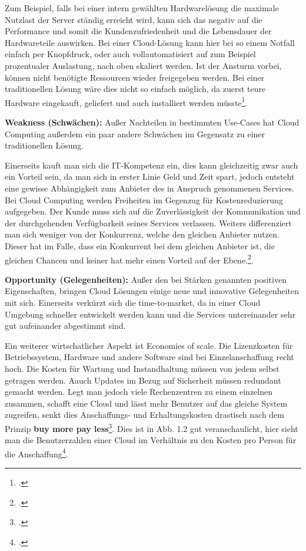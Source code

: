Zum Beispiel, falls bei einer intern gewählten Hardwarelösung die maximale Nutzlast der Server ständig erreicht wird, kann sich das negativ auf die Performance und somit die Kundenzufriedenheit und die Lebensdauer der 
Hardwareteile auswirken. Bei einer Cloud-Lösung kann hier bei so einem Notfall einfach per Knopfdruck, oder auch vollautomatisiert auf zum Beispiel prozentualer Auslastung, nach oben skaliert werden. Ist der Ansturm vorbei, können nicht benötigte Ressourcen wieder freigegeben werden.
Bei einer traditionellen Lösung wäre dies nicht so einfach möglich, da zuerst teure Hardware eingekauft, geliefert und auch installiert werden müsste\footcite{Lehrunterlagen-HTL-cloud}.

\textbf{Weakness (Schwächen):} Außer Nachteilen in bestimmten Use-Cases hat Cloud Computing außerdem ein paar andere Schwächen im Gegensatz zu einer traditionellen Lösung.

Einerseits kauft man sich die IT-Kompetenz ein, dies kann gleichzeitig zwar auch ein Vorteil sein, da man sich in erster 
Linie Geld und Zeit spart, jedoch entsteht eine gewisse Abhängigkeit zum Anbieter des in Anspruch genommenen Services. Bei Cloud Computing werden Freiheiten im Gegenzug für Kostenreduzierung aufgegeben. Der Kunde muss sich auf die Zuverlässigkeit der
Kommunikation und der durchgehenden Verfügbarkeit seines Services verlassen. Weiters differenziert man sich weniger von der Konkurrenz, welche den gleichen Anbieter nutzen. Dieser hat im Falle, dass ein Konkurrent bei dem gleichen Anbieter ist, die gleichen Chancen und keiner hat mehr einen Vorteil auf der Ebene.\footcite{Lehrunterlagen-HTL-cloud}.

\textbf{Opportunity (Gelegenheiten):} Außer den bei Stärken genannten positiven Eigenschaften, bringen Cloud Lösungen einige neue und innovative Gelegenheiten mit sich. Einerseits verkürzt sich die time-to-market, da in einer Cloud Umgebung schneller entwickelt werden kann und die Services
untereinander sehr gut aufeinander abgestimmt sind.

Ein weiterer wirtschatlicher Aspekt ist Economies of scale.
Die Lizenzkosten für Betriebssystem, Hardware und andere Software sind bei Einzelanschaffung recht hoch.
Die Kosten für Wartung und Instandhaltung müssen von jedem selbst getragen werden. Aauch Updates im Bezug auf Sicherheit müssen redundant gemacht werden. Legt man jedoch viele Rechenzentren zu einem einzelnen zusammen, schafft eine Cloud und lässt mehr Benutzer auf das gleiche System zugreifen, senkt
dies Anschaffungs- und Erhaltungskosten drastisch nach dem Prinzip \textbf{buy more pay less}\footcite{eos}. Dies ist in Abb. 1.2 gut veranschaulicht, hier sieht man die Benutzerzahlen einer Cloud im Verhältnis zu den Kosten pro Person für die Anschaffung\footcite{Lehrunterlagen-HTL-cloud}.

